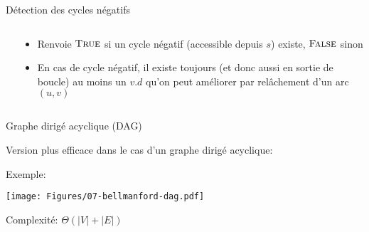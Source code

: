 \begin{frame}{Détection des cycles négatifs}

\begin{columns}
\begin{column}{4.5cm}
\begin{center}
{\small
{}}
\end{center}
\end{column}
\begin{column}{5.5cm}
\begin{itemize}
\item Renvoie $\textnormal{\scshape True}$ si un cycle négatif (accessible depuis
  $s$) existe, $\textnormal{\scshape False}$ sinon
\item En cas de cycle négatif, il existe toujours (et donc aussi en sortie de boucle) au moins un $v.d$ qu'on
  peut améliorer par relâchement d'un arc $(u,v)$
\end{itemize}
\end{column}
\end{columns}

\end{frame}

\begin{frame}{Graphe dirigé acyclique (DAG)}

Version plus efficace dans le cas d'un graphe dirigé acyclique:
\begin{center}
{\small
{}}
\end{center}

\bigskip

Exemple:
\centerline{\texttt{[image: Figures/07-bellmanford-dag.pdf]}}

\bigskip

Complexité: $\Theta(|V|+|E|)$

\end{frame}

